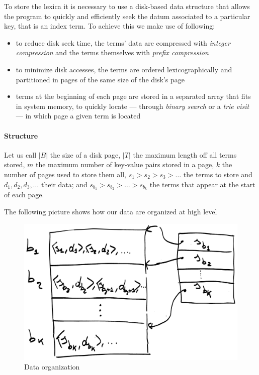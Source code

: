 To store the lexica it is necessary to use a disk-based data structure that
allows the program to quickly and efficiently seek the datum associated to a
particular key, that is an index term. To achieve this we make use of following:

\begin{itemize}
	\item to reduce disk seek time, the terms' data are compressed with
	\textit{integer compression} and the terms themselves with \textit{prefix compression}
	
	\item to minimize disk accesses, the terms are ordered lexicographically
	and partitioned in pages of the same size of the disk's page
	
	\item terms at the beginning of each page are stored in a separated array that fits in system memory, to quickly locate --- through \textit{binary search} or a \textit{trie visit} --- in which page a given term is located
\end{itemize}

\paragraph{Structure}
Let us call $|B|$ the size of a disk page, $|T|$ the maximum length off all terms stored, $m$ the maximum number of key-value pairs stored in a page, $k$ the number of pages used to store them all, $s_1 > s_2 > s_3 > \dots$ the terms to store and $d_1, d_2, d_3, \dots$ their data; and $s_{b_1} > s_{b_2} > \dots > s_{b_k}$ the terms that appear at the start of each page.

The following picture shows how our data are organized at high level

\begin{figure}[H]
	\centering
	\includegraphics[width=0.6\linewidth]{assets/disk_map_base}
	\caption[]{Data organization}
	\label{fig:diskmapbase}
\end{figure}

